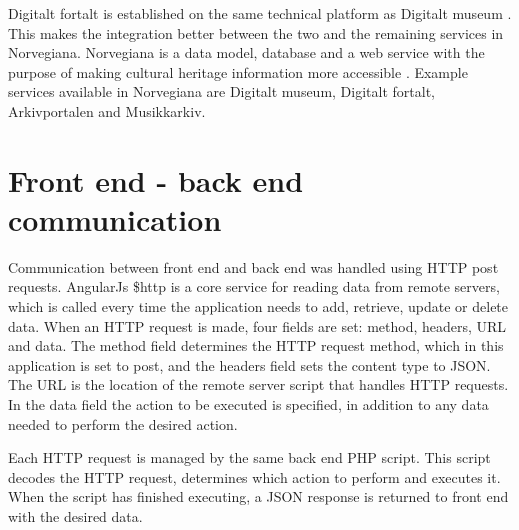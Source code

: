 Digitalt fortalt is established on the same technical platform as Digitalt museum \cite{HM2}. This makes the integration better between the two and the remaining services in Norvegiana. Norvegiana is a data model, database and a web service with the purpose of making cultural heritage information more accessible \cite{HM3}. Example services available in Norvegiana are Digitalt museum, Digitalt fortalt, Arkivportalen and Musikkarkiv. 

\section{Front end - back end communication}
\label{subsec:frontend-backend_communication}

Communication between front end and back end was handled using HTTP post requests.
AngularJs \$http is a core service for reading data from remote servers, which is called every time the application needs to add, retrieve, update or delete data. When an HTTP request is made, four fields are set: method, headers, URL and data. The method field determines the HTTP request method, which in this application is set to post, and the headers field sets the content type to JSON. The URL is the location of the remote server script that handles HTTP requests. In the data field the action to be executed is specified, in addition to any data needed to perform the desired action.\newline

Each HTTP request is managed by the same back end PHP script. This script decodes the HTTP request, determines which action to perform and executes it. When the script has finished executing, a JSON response is returned to front end with the desired data.

\cleardoublepage